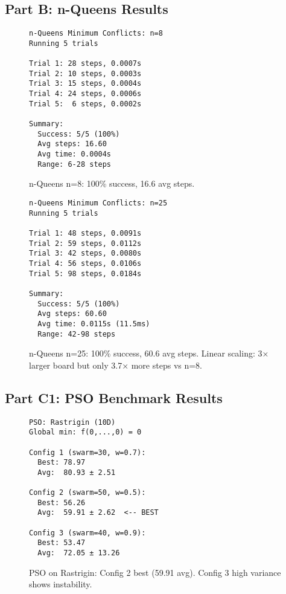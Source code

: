 \documentclass[letterpaper]{article}
\begin{document}
\subsection{Part B: n-Queens Results}

\begin{figure}[h]
\begin{scriptsize}
\begin{verbatim}
n-Queens Minimum Conflicts: n=8
Running 5 trials

Trial 1: 28 steps, 0.0007s
Trial 2: 10 steps, 0.0003s
Trial 3: 15 steps, 0.0004s
Trial 4: 24 steps, 0.0006s
Trial 5:  6 steps, 0.0002s

Summary:
  Success: 5/5 (100%)
  Avg steps: 16.60
  Avg time: 0.0004s
  Range: 6-28 steps
\end{verbatim}
\end{scriptsize}
\caption{n-Queens n=8: 100\% success, 16.6 avg steps.}
\label{fig:nqueens-8}
\end{figure}

\begin{figure}[h]
\begin{scriptsize}
\begin{verbatim}
n-Queens Minimum Conflicts: n=25
Running 5 trials

Trial 1: 48 steps, 0.0091s
Trial 2: 59 steps, 0.0112s
Trial 3: 42 steps, 0.0080s
Trial 4: 56 steps, 0.0106s
Trial 5: 98 steps, 0.0184s

Summary:
  Success: 5/5 (100%)
  Avg steps: 60.60
  Avg time: 0.0115s (11.5ms)
  Range: 42-98 steps
\end{verbatim}
\end{scriptsize}
\caption{n-Queens n=25: 100\% success, 60.6 avg steps. Linear scaling: 3× larger board but only 3.7× more steps vs n=8.}
\label{fig:nqueens-25}
\end{figure}

\subsection{Part C1: PSO Benchmark Results}

\begin{figure}[h]
\begin{scriptsize}
\begin{verbatim}
PSO: Rastrigin (10D)
Global min: f(0,...,0) = 0

Config 1 (swarm=30, w=0.7):
  Best: 78.97
  Avg:  80.93 ± 2.51

Config 2 (swarm=50, w=0.5):
  Best: 56.26
  Avg:  59.91 ± 2.62  <-- BEST

Config 3 (swarm=40, w=0.9):
  Best: 53.47
  Avg:  72.05 ± 13.26
\end{verbatim}
\end{scriptsize}
\caption{PSO on Rastrigin: Config 2 best (59.91 avg). Config 3 high variance shows instability.}
\label{fig:pso-rastrigin}
\end{figure}
\end{document}

